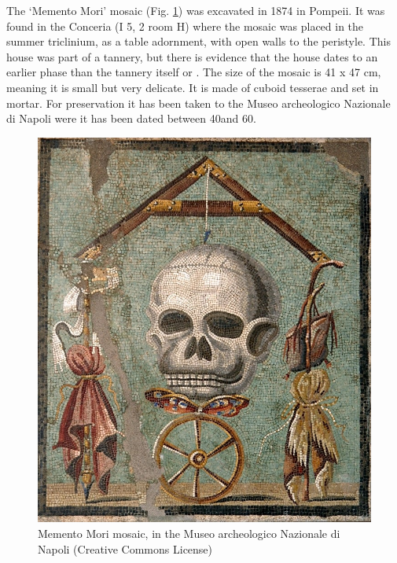 	The ‘Memento Mori’ mosaic (Fig. \ref {fig:heekeren_fig1}) was excavated in 1874 in Pompeii. It was found in the Conceria (I 5, 2 room H) where the mosaic was placed in the summer triclinium, as a table adornment, with open walls to the peristyle. This house was part of a tannery, but there is evidence that the house dates to an earlier phase than the tannery itself \parencite [185]{Baldassarreal_1990} or \parencite[273]{Mau_1874}. The size of the mosaic is 41 x 47 cm, meaning it is small but very delicate. It is made of cuboid tesserae and set in mortar. For preservation it has been taken to the Museo archeologico Nazionale di Napoli were it has been dated between 40\AD and 60\AD  \parencite[9]{Sogliano_1874}.
\begin{figure}[!p]
\centering
\includegraphics[width=\linewidth]{figures/Heekeren_fig1}
\caption{Memento Mori mosaic, in the Museo archeologico Nazionale di Napoli (Creative Commons License)}
\label{fig:heekeren_fig1}
\end{figure}

